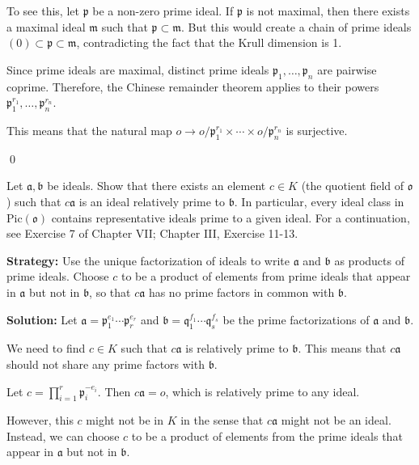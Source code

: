 To see this, let $\mathfrak{p}$ be a non-zero prime ideal. If $\mathfrak{p}$ is not maximal, then there exists a maximal ideal $\mathfrak{m}$ such that $\mathfrak{p} \subset \mathfrak{m}$. But this would create a chain of prime ideals $(0) \subset \mathfrak{p} \subset \mathfrak{m}$, contradicting the fact that the Krull dimension is 1.

Since prime ideals are maximal, distinct prime ideals $\mathfrak{p}_1, \ldots, \mathfrak{p}_n$ are pairwise coprime. Therefore, the Chinese remainder theorem applies to their powers $\mathfrak{p}_1^{r_1}, \ldots, \mathfrak{p}_n^{r_n}$.

This means that the natural map $o \rightarrow o/\mathfrak{p}_1^{r_1} \times \cdots \times o/\mathfrak{p}_n^{r_n}$ is surjective.


\qed
\begin{problembox}
Let $\mathfrak{a}, \mathfrak{b}$ be ideals. Show that there exists an element $c \in K$ (the quotient field of $\mathfrak{o}$) such that $c\mathfrak{a}$ is an ideal relatively prime to $\mathfrak{b}$. In particular, every ideal class in $\text{Pic}(\mathfrak{o})$ contains representative ideals prime to a given ideal. For a continuation, see Exercise 7 of Chapter VII; Chapter III, Exercise 11-13.
\end{problembox}

\noindent\textbf{Strategy:} Use the unique factorization of ideals to write $\mathfrak{a}$ and $\mathfrak{b}$ as products of prime ideals. Choose $c$ to be a product of elements from prime ideals that appear in $\mathfrak{a}$ but not in $\mathfrak{b}$, so that $c\mathfrak{a}$ has no prime factors in common with $\mathfrak{b}$.

\noindent\textbf{Solution:}
Let $\mathfrak{a} = \mathfrak{p}_1^{e_1} \cdots \mathfrak{p}_r^{e_r}$ and $\mathfrak{b} = \mathfrak{q}_1^{f_1} \cdots \mathfrak{q}_s^{f_s}$ be the prime factorizations of $\mathfrak{a}$ and $\mathfrak{b}$.

We need to find $c \in K$ such that $c\mathfrak{a}$ is relatively prime to $\mathfrak{b}$. This means that $c\mathfrak{a}$ should not share any prime factors with $\mathfrak{b}$.

Let $c = \prod_{i=1}^r \mathfrak{p}_i^{-e_i}$. Then $c\mathfrak{a} = o$, which is relatively prime to any ideal.

However, this $c$ might not be in $K$ in the sense that $c\mathfrak{a}$ might not be an ideal. Instead, we can choose $c$ to be a product of elements from the prime ideals that appear in $\mathfrak{a}$ but not in $\mathfrak{b}$.

